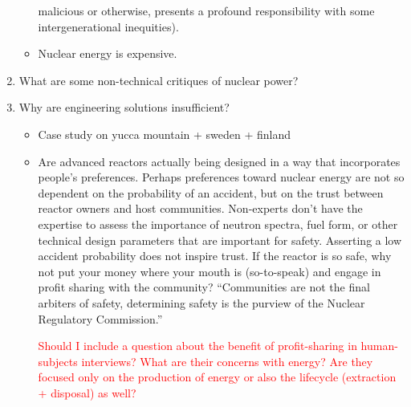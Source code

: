 \begin{enumerate}
\begin{itemize}
    malicious or otherwise, presents a profound responsibility with some
    intergenerational inequities).
    \item Nuclear energy is expensive.
\end{itemize}
\item What are some non-technical critiques of nuclear power?
\item Why are engineering solutions insufficient?
\begin{itemize}
    \item Case study on yucca mountain + sweden + finland
    \item Are advanced reactors actually being designed in a way that incorporates people's preferences.
    Perhaps preferences toward nuclear energy are not so dependent on the probability of an accident, but
    on the trust between reactor owners and host communities. Non-experts don't have the expertise to assess
    the importance of neutron spectra, fuel form, or other technical design parameters that are important for safety.
    Asserting a low accident probability does not inspire trust. If the reactor is so safe, why not put your money
    where your mouth is (so-to-speak) and engage in profit sharing with the community? 
    ``Communities are not the final arbiters of safety, determining safety is the purview of the Nuclear Regulatory Commission.''


    \textcolor{red}{Should I include a question about the benefit of profit-sharing in human-subjects interviews? 
    What are their concerns with energy? Are they focused only on the production of energy or also the lifecycle 
    (extraction + disposal) as well?}
\end{itemize}
\end{enumerate}
